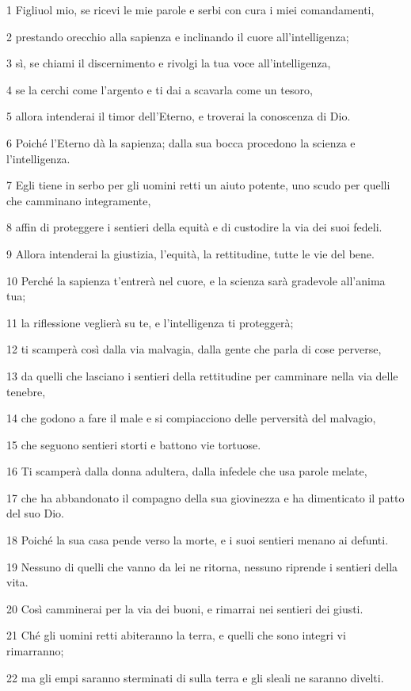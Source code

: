 \par 1 Figliuol mio, se ricevi le mie parole e serbi con cura i miei comandamenti,
\par 2 prestando orecchio alla sapienza e inclinando il cuore all'intelligenza;
\par 3 sì, se chiami il discernimento e rivolgi la tua voce all'intelligenza,
\par 4 se la cerchi come l'argento e ti dai a scavarla come un tesoro,
\par 5 allora intenderai il timor dell'Eterno, e troverai la conoscenza di Dio.
\par 6 Poiché l'Eterno dà la sapienza; dalla sua bocca procedono la scienza e l'intelligenza.
\par 7 Egli tiene in serbo per gli uomini retti un aiuto potente, uno scudo per quelli che camminano integramente,
\par 8 affin di proteggere i sentieri della equità e di custodire la via dei suoi fedeli.
\par 9 Allora intenderai la giustizia, l'equità, la rettitudine, tutte le vie del bene.
\par 10 Perché la sapienza t'entrerà nel cuore, e la scienza sarà gradevole all'anima tua;
\par 11 la riflessione veglierà su te, e l'intelligenza ti proteggerà;
\par 12 ti scamperà così dalla via malvagia, dalla gente che parla di cose perverse,
\par 13 da quelli che lasciano i sentieri della rettitudine per camminare nella via delle tenebre,
\par 14 che godono a fare il male e si compiacciono delle perversità del malvagio,
\par 15 che seguono sentieri storti e battono vie tortuose.
\par 16 Ti scamperà dalla donna adultera, dalla infedele che usa parole melate,
\par 17 che ha abbandonato il compagno della sua giovinezza e ha dimenticato il patto del suo Dio.
\par 18 Poiché la sua casa pende verso la morte, e i suoi sentieri menano ai defunti.
\par 19 Nessuno di quelli che vanno da lei ne ritorna, nessuno riprende i sentieri della vita.
\par 20 Così camminerai per la via dei buoni, e rimarrai nei sentieri dei giusti.
\par 21 Ché gli uomini retti abiteranno la terra, e quelli che sono integri vi rimarranno;
\par 22 ma gli empi saranno sterminati di sulla terra e gli sleali ne saranno divelti.

